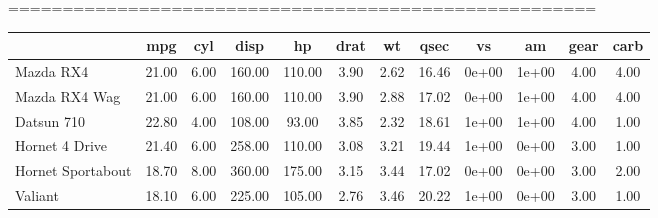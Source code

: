 %
%
======================================================
\begin{tabular}{lccccccccccc}
\hline
\textbf{} & \textbf{mpg} & \textbf{cyl} & \textbf{disp} & \textbf{hp} & \textbf{drat} & \textbf{wt} & \textbf{qsec} & \textbf{vs} & \textbf{am} & \textbf{gear} & \textbf{carb} \\
\hline
Mazda RX4 & 21.00 & 6.00 & 160.00 & 110.00 & 3.90 & 2.62 & 16.46 & 0e+00 & 1e+00 & 4.00 & 4.00\\
Mazda RX4 Wag & 21.00 & 6.00 & 160.00 & 110.00 & 3.90 & 2.88 & 17.02 & 0e+00 & 1e+00 & 4.00 & 4.00\\
Datsun 710 & 22.80 & 4.00 & 108.00 &  93.00 & 3.85 & 2.32 & 18.61 & 1e+00 & 1e+00 & 4.00 & 1.00\\
Hornet 4 Drive & 21.40 & 6.00 & 258.00 & 110.00 & 3.08 & 3.21 & 19.44 & 1e+00 & 0e+00 & 3.00 & 1.00\\
Hornet Sportabout & 18.70 & 8.00 & 360.00 & 175.00 & 3.15 & 3.44 & 17.02 & 0e+00 & 0e+00 & 3.00 & 2.00\\
Valiant & 18.10 & 6.00 & 225.00 & 105.00 & 2.76 & 3.46 & 20.22 & 1e+00 & 0e+00 & 3.00 & 1.00\\
\hline
\end{tabular}
